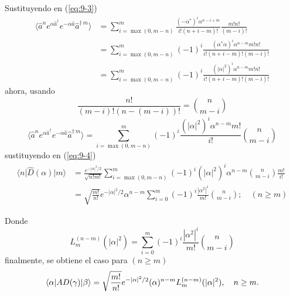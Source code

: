 \begin{enumerate}
        Sustituyendo en (\ref{eq:9-3})
        \begin{align*}
          \langle \hat{a}^{n} e^{\alpha\hat{a}^{\dagger}} e^{-\alpha \hat{a}} \hat{a}^{\dagger\,m} \rangle & = \sum_{i=\max(0,m-n)}^{m} \frac{(-\alpha^*)^{i} \alpha^{n-i+m}}{i! (n+i-m)!} \frac{m!n!}{(m-i)!}   \\
                                                                                                           & = \sum_{i=\max(0,m-n)}^{m} (-1)^{i} \frac{(\alpha^*\alpha)^{i} \alpha^{n-m} m!n!}{i!(n+i-m)!(m-i)!} \\
                                                                                                           & = \sum_{i=\max(0,m-n)}^{m} (-1)^{i} \frac{(|\alpha|^2)^{i} \alpha^{n-m} m!n!}{i!(n+i-m)!(m-i)!}
        \end{align*}
        ahora, usando
        \begin{equation*}
          \frac{n!}{(m-i)!(n-(m-i))!} = \binom{n }{m-i}
        \end{equation*}
        \begin{equation*}
          \langle \hat{a}^{n} e^{\alpha\hat{a}^{\dagger}} e^{-\alpha \hat{a}} \hat{a}^{\dagger\,m} \rangle = \sum_{i=\max(0,m-n)}^{m} (-1)^{i} \frac{(|\alpha|^2)^{i} \alpha^{n-m} m!}{i!} \binom{n }{m-i}
        \end{equation*}
        sustituyendo en (\ref{eq:9-4})
        \begin{align*}
          \langle n \vert \hat{D}(\alpha) \vert m \rangle & = \frac{e^{-|\alpha|^2/2}}{\sqrt{n!m!}} \sum_{i=\max(0, m-n)}^{m} (-1)^{i} (|\alpha|^2)^{i}\alpha^{n-m} \binom{n }{m-i}\frac{m!}{i!}    \\
                                                          & = \sqrt{\frac{m!}{n!}} e^{-|\alpha|^2/2} \alpha^{n-m} \sum_{i=0}^{m}(-1)^{i} \frac{|\alpha^2|^{i}}{m!} \binom{n}{m-i} ; \quad (n\geq m)
        \end{align*}

        Donde
        \begin{equation*}
          L_m^{(n-m)}(|\alpha|^2) = \sum_{i=0}^{m}(-1)^{i} \frac{|\alpha^2|^{i}}{m!} \binom{n}{m-i}
        \end{equation*}
        finalmente, se obtiene el caso para $(n\geq m)$
        \begin{equation*}
          \langle \alpha \vert \hat{D}(\gamma) \vert \beta\rangle = \sqrt{\frac{m!}{n!}}e^{-|\alpha|^2/2}(\alpha)^{n-m}L_m^{(n-m)}(|\alpha|^2),\quad n\geq m.                                                                \\
        \end{equation*}


\end{enumerate}
